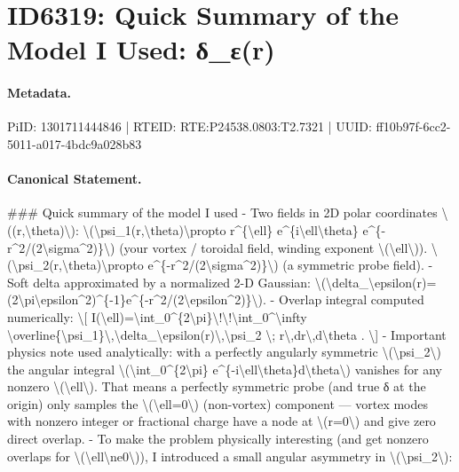 \section*{ID6319: Quick Summary of the Model I Used: δ\_ε(r)}
\paragraph{Metadata.}
PiID: 1301711444846 | RTEID: RTE:P24538.0803:T2.7321 | UUID: ff10b97f-6cc2-5011-a017-4bdc9a028b83

\paragraph{Canonical Statement.}
\#\#\# Quick summary of the model I used - Two fields in 2D polar coordinates \textbackslash{}((r,\textbackslash{}theta)\textbackslash{}): \textbackslash{}(\textbackslash{}psi\_1(r,\textbackslash{}theta)\textbackslash{}propto r\textasciicircum{}\{\textbackslash{}ell\} e\textasciicircum{}\{i\textbackslash{}ell\textbackslash{}theta\} e\textasciicircum{}\{-r\textasciicircum{}2/(2\textbackslash{}sigma\textasciicircum{}2)\}\textbackslash{}) (your vortex / toroidal field, winding exponent \textbackslash{}(\textbackslash{}ell\textbackslash{})). \textbackslash{}(\textbackslash{}psi\_2(r,\textbackslash{}theta)\textbackslash{}propto e\textasciicircum{}\{-r\textasciicircum{}2/(2\textbackslash{}sigma\textasciicircum{}2)\}\textbackslash{}) (a symmetric probe field). - Soft delta approximated by a normalized 2-D Gaussian: \textbackslash{}(\textbackslash{}delta\_\textbackslash{}epsilon(r)=(2\textbackslash{}pi\textbackslash{}epsilon\textasciicircum{}2)\textasciicircum{}\{-1\}e\textasciicircum{}\{-r\textasciicircum{}2/(2\textbackslash{}epsilon\textasciicircum{}2)\}\textbackslash{}). - Overlap integral computed numerically: \textbackslash{}[ I(\textbackslash{}ell)=\textbackslash{}int\_0\textasciicircum{}\{2\textbackslash{}pi\}\textbackslash{}!\textbackslash{}!\textbackslash{}int\_0\textasciicircum{}\textbackslash{}infty \textbackslash{}overline\{\textbackslash{}psi\_1\}\textbackslash{},\textbackslash{}delta\_\textbackslash{}epsilon(r)\textbackslash{},\textbackslash{}psi\_2 \textbackslash{}; r\textbackslash{},dr\textbackslash{},d\textbackslash{}theta . \textbackslash{}] - Important physics note used analytically: with a perfectly angularly symmetric \textbackslash{}(\textbackslash{}psi\_2\textbackslash{}) the angular integral \textbackslash{}(\textbackslash{}int\_0\textasciicircum{}\{2\textbackslash{}pi\} e\textasciicircum{}\{-i\textbackslash{}ell\textbackslash{}theta\}d\textbackslash{}theta\textbackslash{}) vanishes for any nonzero \textbackslash{}(\textbackslash{}ell\textbackslash{}). That means a perfectly symmetric probe (and true δ at the origin) only samples the \textbackslash{}(\textbackslash{}ell=0\textbackslash{}) (non-vortex) component — vortex modes with nonzero integer or fractional charge have a node at \textbackslash{}(r=0\textbackslash{}) and give zero direct overlap. - To make the problem physically interesting (and get nonzero overlaps for \textbackslash{}(\textbackslash{}ell\textbackslash{}ne0\textbackslash{})), I introduced a small angular asymmetry in \textbackslash{}(\textbackslash{}psi\_2\textbackslash{}): 